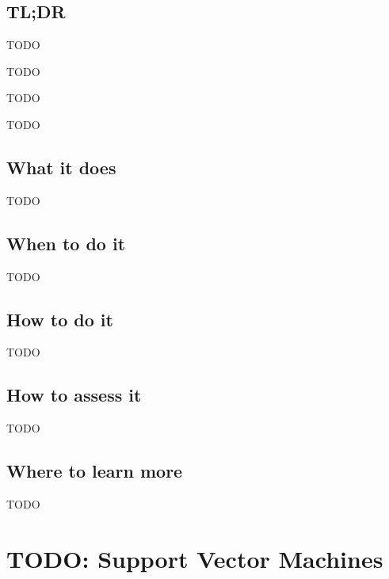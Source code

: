 \documentclass[
]{book}
\providecommand{\tightlist}{%
  \setlength{\itemsep}{0pt}\setlength{\parskip}{0pt}}
\begin{document}
\hypertarget{tldr-18}{%
\section{TL;DR}\label{tldr-18}}

\begin{description}
\tightlist
\item[What it does]
TODO
\item[When to do it]
TODO
\item[How to do it]
TODO
\item[How to assess it]
TODO
\end{description}

\hypertarget{what-it-does-18}{%
\section{What it does}\label{what-it-does-18}}

TODO

\hypertarget{when-to-do-it-18}{%
\section{When to do it}\label{when-to-do-it-18}}

TODO

\hypertarget{how-to-do-it-18}{%
\section{How to do it}\label{how-to-do-it-18}}

TODO

\hypertarget{how-to-assess-it-18}{%
\section{How to assess it}\label{how-to-assess-it-18}}

TODO

\hypertarget{where-to-learn-more-18}{%
\section{Where to learn more}\label{where-to-learn-more-18}}

TODO

\hypertarget{support-vector-machines}{%
\chapter{TODO: Support Vector Machines}\label{support-vector-machines}}
\end{document}
